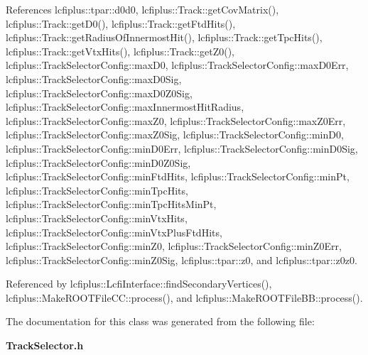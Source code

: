 References lcfiplus\+::tpar\+::d0d0, lcfiplus\+::\+Track\+::get\+Cov\+Matrix(), lcfiplus\+::\+Track\+::get\+D0(), lcfiplus\+::\+Track\+::get\+Ftd\+Hits(), lcfiplus\+::\+Track\+::get\+Radius\+Of\+Innermost\+Hit(), lcfiplus\+::\+Track\+::get\+Tpc\+Hits(), lcfiplus\+::\+Track\+::get\+Vtx\+Hits(), lcfiplus\+::\+Track\+::get\+Z0(), lcfiplus\+::\+Track\+Selector\+Config\+::max\+D0, lcfiplus\+::\+Track\+Selector\+Config\+::max\+D0\+Err, lcfiplus\+::\+Track\+Selector\+Config\+::max\+D0\+Sig, lcfiplus\+::\+Track\+Selector\+Config\+::max\+D0\+Z0\+Sig, lcfiplus\+::\+Track\+Selector\+Config\+::max\+Innermost\+Hit\+Radius, lcfiplus\+::\+Track\+Selector\+Config\+::max\+Z0, lcfiplus\+::\+Track\+Selector\+Config\+::max\+Z0\+Err, lcfiplus\+::\+Track\+Selector\+Config\+::max\+Z0\+Sig, lcfiplus\+::\+Track\+Selector\+Config\+::min\+D0, lcfiplus\+::\+Track\+Selector\+Config\+::min\+D0\+Err, lcfiplus\+::\+Track\+Selector\+Config\+::min\+D0\+Sig, lcfiplus\+::\+Track\+Selector\+Config\+::min\+D0\+Z0\+Sig, lcfiplus\+::\+Track\+Selector\+Config\+::min\+Ftd\+Hits, lcfiplus\+::\+Track\+Selector\+Config\+::min\+Pt, lcfiplus\+::\+Track\+Selector\+Config\+::min\+Tpc\+Hits, lcfiplus\+::\+Track\+Selector\+Config\+::min\+Tpc\+Hits\+Min\+Pt, lcfiplus\+::\+Track\+Selector\+Config\+::min\+Vtx\+Hits, lcfiplus\+::\+Track\+Selector\+Config\+::min\+Vtx\+Plus\+Ftd\+Hits, lcfiplus\+::\+Track\+Selector\+Config\+::min\+Z0, lcfiplus\+::\+Track\+Selector\+Config\+::min\+Z0\+Err, lcfiplus\+::\+Track\+Selector\+Config\+::min\+Z0\+Sig, lcfiplus\+::tpar\+::z0, and lcfiplus\+::tpar\+::z0z0.



Referenced by lcfiplus\+::\+Lcfi\+Interface\+::find\+Secondary\+Vertices(), lcfiplus\+::\+Make\+R\+O\+O\+T\+File\+C\+C\+::process(), and lcfiplus\+::\+Make\+R\+O\+O\+T\+File\+B\+B\+::process().



The documentation for this class was generated from the following file\+:\begin{DoxyCompactItemize}
\item 
\textbf{ Track\+Selector.\+h}\end{DoxyCompactItemize}
